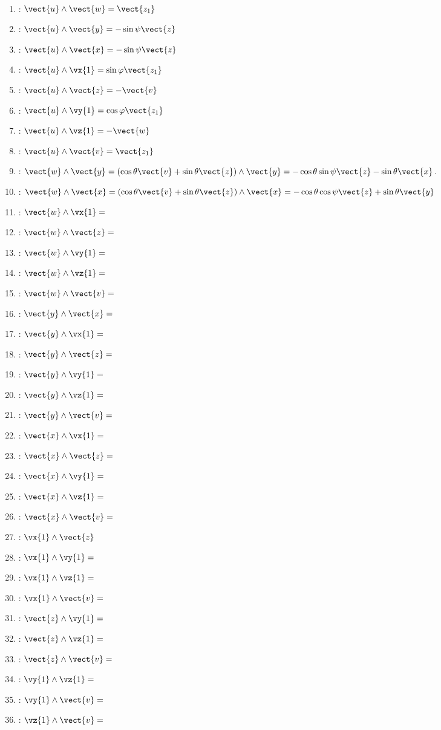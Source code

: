 \ifprof~\\
\begin{enumerate}
\item : $\vect{u}\wedge\vect{w} = \vect{z_1}$
\item : $\vect{u}\wedge\vect{y} = -\sin\psi \vect{z}$
\item : $\vect{u}\wedge\vect{x} = -\sin\psi \vect{z}$
\item : $\vect{u}\wedge\vx{1} = \sin\varphi \vect{z_1}$
\item : $\vect{u}\wedge\vect{z} = -\vect{v}$
\item : $\vect{u}\wedge\vy{1} =  \cos\varphi \vect{z_1}$
\item : $\vect{u}\wedge\vz{1} = -\vect{w}$
\item : $\vect{u}\wedge\vect{v} = \vect{z_1}$
\item : $\vect{w}\wedge\vect{y} = \left( \cos\theta \vect{v}+\sin\theta \vect{z}\right)\wedge\vect{y} = -\cos\theta  \sin \psi \vect{z}-\sin\theta \vect{x}$.
\item : $\vect{w}\wedge\vect{x} =\left( \cos\theta \vect{v}+\sin\theta \vect{z}\right)\wedge\vect{x} = -\cos\theta\cos\psi \vect{z}+\sin\theta \vect{y}$
\item : $\vect{w}\wedge\vx{1} = $
\item : $\vect{w}\wedge\vect{z} = $
\item : $\vect{w}\wedge\vy{1} = $
\item : $\vect{w}\wedge\vz{1} = $
\item : $\vect{w}\wedge\vect{v} = $
\item : $\vect{y}\wedge\vect{x} = $
\item : $\vect{y}\wedge\vx{1} = $
\item : $\vect{y}\wedge\vect{z} = $
\item : $\vect{y}\wedge\vy{1} = $
\item : $\vect{y}\wedge\vz{1} = $
\item : $\vect{y}\wedge\vect{v} = $
\item : $\vect{x}\wedge\vx{1} = $
\item : $\vect{x}\wedge\vect{z} = $
\item : $\vect{x}\wedge\vy{1} = $
\item : $\vect{x}\wedge\vz{1} = $
\item : $\vect{x}\wedge\vect{v} = $
\item : $\vx{1}\wedge\vect{z}$
\item : $\vx{1}\wedge\vy{1} = $
\item : $\vx{1}\wedge\vz{1} = $
\item : $\vx{1}\wedge\vect{v} = $
\item : $\vect{z}\wedge\vy{1} = $
\item : $\vect{z}\wedge\vz{1} = $
\item : $\vect{z}\wedge\vect{v} = $
\item : $\vy{1}\wedge\vz{1} = $
\item : $\vy{1}\wedge\vect{v} = $
\item : $\vz{1}\wedge\vect{v} = $
\end{enumerate}
